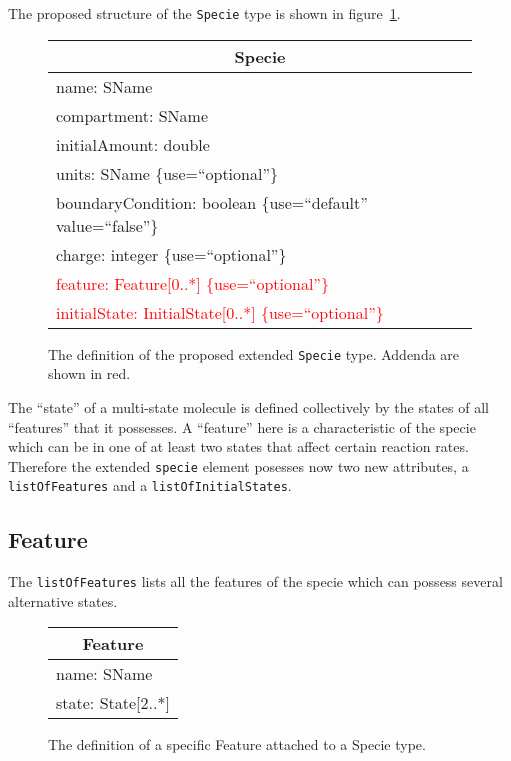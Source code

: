\documentclass{cekarticle}
\begin{document}
The proposed structure of the \texttt{Specie} type is shown in
figure~\ref{fig:specie}.

\begin{figure}[h]
  \vspace*{8pt}
  \centering
  \begin{tabular}{|l|}
    \hline
    \multicolumn{1}{|c|}{\rule[-3mm]{0mm}{8mm}{\textsf{Specie}}}\\
    \hline
    \rule[0mm]{0mm}{5mm}{\textsf{\small name: SName }}\\
    \textsf{\small compartment: SName }\\
    \textsf{\small initialAmount: double }\\
    \textsf{\small units: SName \{use=``optional''\}  }\\
    \textsf{\small boundaryCondition: boolean \{use=``default'' value=``false''\} }\\
    \textsf{\small charge: integer \{use=``optional''\} }\\
    \textsf{\small \textcolor{red}{feature: Feature[0..*] \{use=``optional''\}} }\\
    \rule[-3mm]{0mm}{5mm}{\textsf{\small \textcolor{red}{initialState: InitialState[0..*] \{use=``optional''\}} }}\\
    \hline
  \end{tabular}
  \caption{The definition of the proposed extended \texttt{Specie} type. Addenda are shown in red.}
  \label{fig:specie}
\end{figure}

The ``state'' of a multi-state molecule is defined collectively by the states of
all ``features'' that it possesses.  A ``feature'' here is a characteristic of the
specie which can be in one of at least two states that affect certain reaction
rates.  Therefore the extended \texttt{specie} element posesses now two new attributes, a
\texttt{listOfFeatures} and a \texttt{listOfInitialStates}.

\subsection{Feature}\label{sec:feature}

The \texttt{listOfFeatures} lists all the features of the specie which can
possess several alternative states.

\begin{figure}[h]
  \vspace*{8pt}
  \centering
  \textcolor{red}{%
  \begin{tabular}{|l|}
    \hline
    \multicolumn{1}{|c|}{\rule[-3mm]{0mm}{8mm}{\textsf{Feature}}}\\
    \hline
    \rule[0mm]{0mm}{5mm}{\textsf{\small name: SName }}\\
    \rule[-3mm]{0mm}{5mm}{\textsf{\small state: State[2..*] }}\\
    \hline
  \end{tabular}
}
  \caption{The definition of a specific Feature attached to a Specie type.}
  \label{fig:feature}
\end{figure}
\end{document}
